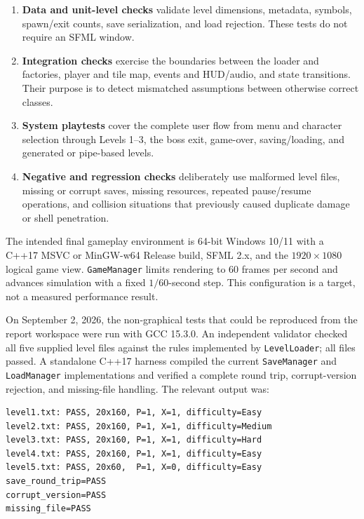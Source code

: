 \documentclass{template}
\begin{document}
\begin{enumerate}
    \item \textbf{Data and unit-level checks} validate level dimensions,
          metadata, symbols, spawn/exit counts, save serialization, and load
          rejection. These tests do not require an SFML window.
    \item \textbf{Integration checks} exercise the boundaries between the
          loader and factories, player and tile map, events and HUD/audio, and
          state transitions. Their purpose is to detect mismatched assumptions
          between otherwise correct classes.
    \item \textbf{System playtests} cover the complete user flow from menu and
          character selection through Levels 1--3, the boss exit, game-over,
          saving/loading, and generated or pipe-based levels.
    \item \textbf{Negative and regression checks} deliberately use malformed
          level files, missing or corrupt saves, missing resources, repeated
          pause/resume operations, and collision situations that previously
          caused duplicate damage or shell penetration.
\end{enumerate}

The intended final gameplay environment is 64-bit Windows 10/11 with a C++17
MSVC or MinGW-w64 Release build, SFML 2.x, and the $1920\times1080$ logical game
view. \texttt{GameManager} limits rendering to 60 frames per second and advances
simulation with a fixed $1/60$-second step. This configuration is a target, not
a measured performance result.

On September 2, 2026, the non-graphical tests that could be reproduced from the
report workspace were run with GCC 15.3.0. An independent validator checked all
five supplied level files against the rules implemented by
\texttt{LevelLoader}; all files passed. A standalone C++17 harness compiled the
current \texttt{SaveManager} and \texttt{LoadManager} implementations and
verified a complete round trip, corrupt-version rejection, and missing-file
handling. The relevant output was:

\begin{lstlisting}[style=gamecode,numbers=none,caption={Reproduced data and persistence checks.}]
level1.txt: PASS, 20x160, P=1, X=1, difficulty=Easy
level2.txt: PASS, 20x160, P=1, X=1, difficulty=Medium
level3.txt: PASS, 20x160, P=1, X=1, difficulty=Hard
level4.txt: PASS, 20x160, P=1, X=1, difficulty=Easy
level5.txt: PASS, 20x60,  P=1, X=0, difficulty=Easy
save_round_trip=PASS
corrupt_version=PASS
missing_file=PASS
\end{lstlisting}
\end{document}
